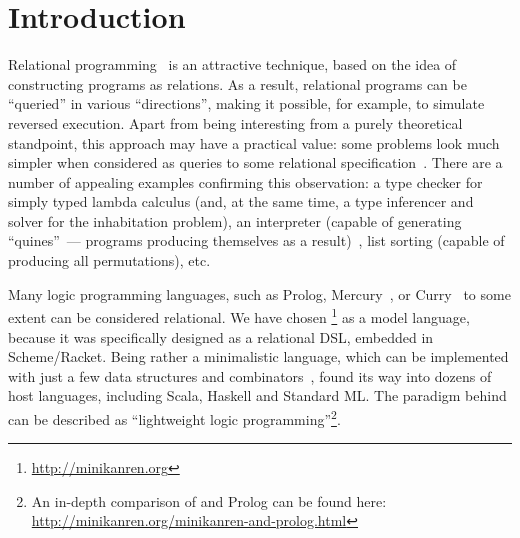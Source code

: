 \section{Introduction}
\label{intro}

Relational programming~\cite{TRS} is an attractive technique, based on the idea
of constructing programs as relations.  As a result, relational programs can be
``queried'' in various ``directions'', making it possible, for example, to simulate
reversed execution. Apart from being interesting from a purely theoretical standpoint,
this approach may have a practical value: some problems look much simpler
when considered as queries to some relational specification~\cite{WillThesis}. There are a
number of appealing examples confirming this observation: a type checker
for simply typed lambda calculus (and, at the same time, a type inferencer and solver
for the inhabitation problem), an interpreter (capable of generating ``quines''~---
programs producing themselves as a result)~\cite{Untagged}, list sorting (capable of
producing all permutations), etc.

Many logic programming languages, such as Prolog, Mercury~\cite{MercuryFirstPaper},
or Curry~\cite{CurryFirstPaper} to some extent
can be considered relational. We have chosen \miniKanren\footnote{\url{http://minikanren.org}}
as a model language, because it was specifically designed as a relational DSL, embedded in Scheme/Racket.
Being rather a minimalistic language, which can be implemented with just a few data structures and
combinators~\cite{MicroKanren, MuKanrenNew}, \miniKanren found its way into dozens of host languages, including Scala, Haskell and Standard ML.
The paradigm behind \miniKanren can be described as ``lightweight logic programming''\footnote{An in-depth comparison of \miniKanren
and Prolog can be found here: \url{http://minikanren.org/minikanren-and-prolog.html}}.

